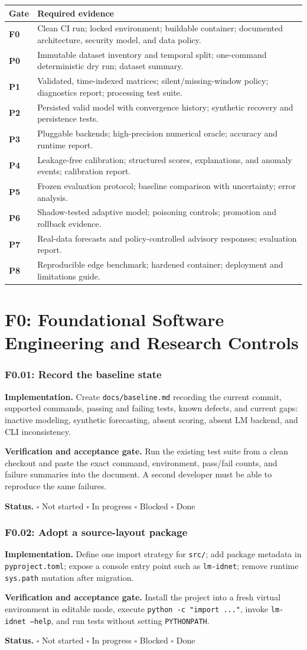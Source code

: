 \documentclass[11pt,a4paper]{article}
\newcommand{\status}{\(\square\) Not started \quad \(\square\) In progress \quad \(\square\) Blocked \quad \(\square\) Done}
\newcommand{\task}[4]{%
  \subsubsection{#1: #2}
  \textbf{Implementation.} #3

  \textbf{Verification and acceptance gate.} #4

  \textbf{Status.} \status
}
\newcommand{\artifact}[1]{\texttt{#1}}
\begin{document}
\begin{longtable}{>{\bfseries}p{}p{}}
\toprule
Gate & Required evidence \\
\midrule
\endhead
F0 & Clean CI run; locked environment; buildable container; documented architecture, security model, and data policy. \\
P0 & Immutable dataset inventory and temporal split; one-command deterministic dry run; dataset summary. \\
P1 & Validated, time-indexed matrices; silent/missing-window policy; diagnostics report; processing test suite. \\
P2 & Persisted valid model with convergence history; synthetic recovery and persistence tests. \\
P3 & Pluggable backends; high-precision numerical oracle; accuracy and runtime report. \\
P4 & Leakage-free calibration; structured scores, explanations, and anomaly events; calibration report. \\
P5 & Frozen evaluation protocol; baseline comparison with uncertainty; error analysis. \\
P6 & Shadow-tested adaptive model; poisoning controls; promotion and rollback evidence. \\
P7 & Real-data forecasts and policy-controlled advisory responses; evaluation report. \\
P8 & Reproducible edge benchmark; hardened container; deployment and limitations guide. \\
\bottomrule
\end{longtable}

\section{F0: Foundational Software Engineering and Research Controls}

\task{F0.01}{Record the baseline state}{Create \artifact{docs/baseline.md} recording the current commit, supported commands, passing and failing tests, known defects, and current gaps: inactive modeling, synthetic forecasting, absent scoring, absent LM backend, and CLI inconsistency.}{Run the existing test suite from a clean checkout and paste the exact command, environment, pass/fail counts, and failure summaries into the document. A second developer must be able to reproduce the same failures.}

\task{F0.02}{Adopt a source-layout package}{Define one import strategy for \artifact{src/}; add package metadata in \artifact{pyproject.toml}; expose a console entry point such as \artifact{lm-idnet}; remove runtime \artifact{sys.path} mutation after migration.}{Install the project into a fresh virtual environment in editable mode, execute \artifact{python -c "import ..."}, invoke \artifact{lm-idnet --help}, and run tests without setting \artifact{PYTHONPATH}.}
\end{document}
